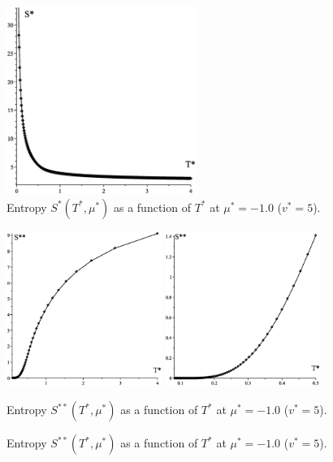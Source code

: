 \documentclass[12pt]{article}
\numberwithin{equation}{section}
\begin{document}
	\begin{figure}[htbp]
		\includegraphics[width=0.55\textwidth,angle=0]{S_vs_T1}
		\centering
		\captionsetup{width=0.5\textwidth}
		{\caption{\label{fig:S_vs_T1} Entropy $S^{*}(T^*,\mu^*)$ as a function of $T^*$ at $\mu^*=-1.0$ ($v^* = 5$).}}
	\end{figure}
	
	\begin{figure}[htbp]
		\includegraphics[width=0.45\textwidth,angle=0]{SS_vs_T1}
		\hfill
		\includegraphics[width=0.45\textwidth,angle=0]{SS_vs_T2}
		\\
		\parbox{0.45\textwidth}{\caption{\label{fig:SS_vs_T1} Entropy $S^{**}(T^*,\mu^*)$ as a function of $T^*$ at $\mu^*=-1.0$ ($v^* = 5$).}}
		\hfill
		\parbox{0.45\textwidth}{\caption{\label{fig:SS_vs_T2} Entropy $S^{**}(T^*,\mu^*)$ as a function of $T^*$ at $\mu^*=-1.0$ ($v^* = 5$).}}
	\end{figure}
	
\end{document}
